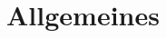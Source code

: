 \documentclass[../validierung.tex]{subfiles}
\begin{document}
\clearpage
\section{Allgemeines}
\end{document}
